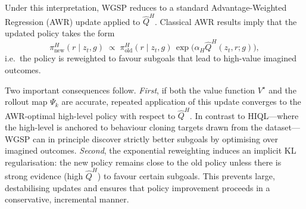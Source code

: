 Under this interpretation, WGSP reduces to a standard
Advantage-Weighted Regression (AWR) update applied to $\hat Q^H$.
Classical AWR results \citep{awr} imply that the updated policy takes
the form
\begin{equation*}
\pi^H_{\text{new}}(r \mid z_t, g)
\;\propto\;
\pi^H_{\text{old}}(r \mid z_t, g)\,
\exp\!\big(\alpha_H \hat Q^H(z_t, r; g)\big),
\end{equation*}
i.e.\ the policy is reweighted to favour subgoals that lead to
high-value imagined outcomes.

Two important consequences follow. \emph{First}, if both the value
function $V^\star$ and the rollout map $\Psi_k$ are accurate, repeated
application of this update converges to the AWR-optimal high-level
policy with respect to $\hat Q^H$. In contrast to HIQL—where the
high-level is anchored to behaviour cloning targets drawn from the
dataset—WGSP can in principle discover strictly better subgoals by
optimising over imagined outcomes. \emph{Second}, the exponential
reweighting induces an implicit KL regularisation: the new policy
remains close to the old policy unless there is strong evidence (high
$\hat Q^H$) to favour certain subgoals. This prevents large,
destabilising updates and ensures that policy improvement proceeds in a
conservative, incremental manner.



